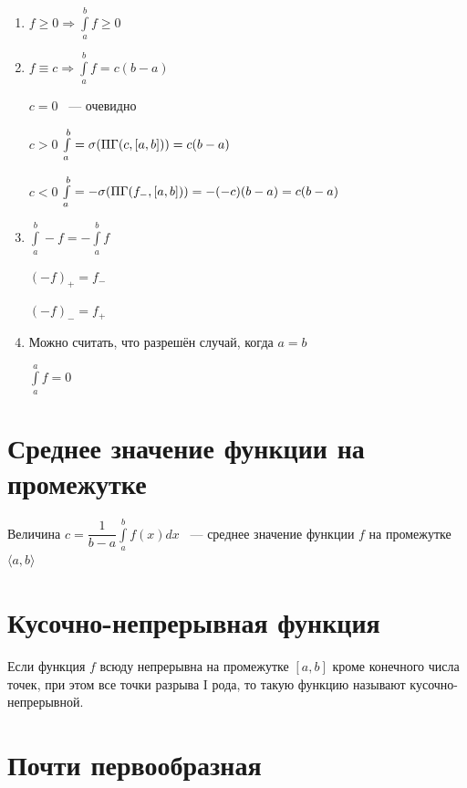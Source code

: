 \documentclass{article}
\begin{document}
		    \begin{enumerate}
		    
		        \item $f \geq 0 \Rightarrow \int\limits^b_a f \geq 0$
		        
		    	\item $f \equiv c \Rightarrow \int\limits^b_a f = c(b - a)$
		        
		        	$c = 0$ ~--- очевидно
		            
		            $c > 0$ $\int\limits^b_a = \sigma(\Pi\Gamma(c, [a, b])) = c(b - a)$
		            
		            $c < 0$ $\int\limits^b_a = -\sigma(\Pi\Gamma(f_-, [a, b])) = -(-c)(b - a) = c(b - a)$
		            
		       \item $\int\limits^b_a -f = - \int\limits^b_a f$
		       
		       		$(-f)_+ = f_-$
		       		
		       		$(-f)_- = f_+$
		       		
		       \item Можно считать, что разрешён случай, когда $a = b$
		       
		       		$\int\limits^a_a f = 0$
		       				
		    \end{enumerate}

	\newpage

	\section{Среднее значение функции на промежутке}
	
        Величина $c = \dfrac{1}{b - a} \int\limits^b_a f(x) dx$ ~--- среднее значение функции $f$ на промежутке $\langle a, b \rangle$
        
    \newpage
    
	\section{Кусочно-непрерывная функция}
	
		Если функция $f$ всюду непрерывна на промежутке $[a, b]$ кроме конечного числа точек, при этом все точки разрыва I рода, то такую функцию называют кусочно-непрерывной.
		
	\newpage
	
	\section{Почти первообразная}
	
\end{document}
